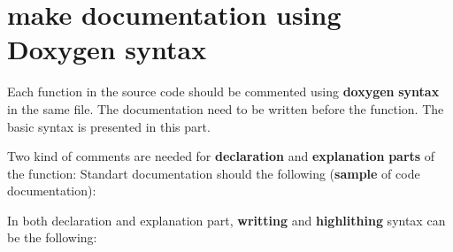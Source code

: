 \hypertarget{index_sectionDoxygenSyntax}{}\section{make documentation using Doxygen syntax}\label{index_sectionDoxygenSyntax}
Each function in the source code should be commented using {\bfseries doxygen} {\bfseries syntax} in the same file. The documentation need to be written before the function. The basic syntax is presented in this part. 
\begin{DoxyVerbInclude}
\end{DoxyVerbInclude}


Two kind of comments are needed for {\bfseries declaration} and {\bfseries explanation} {\bfseries parts} of the function: Standart documentation should the following ({\bfseries sample} of code documentation): 
\begin{DoxyVerbInclude}
\end{DoxyVerbInclude}


In both declaration and explanation part, {\bfseries writting} and {\bfseries highlithing} syntax can be the following:\par
\par


